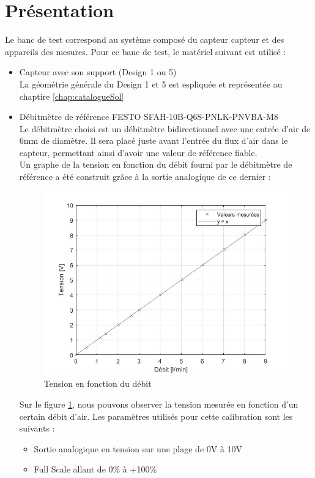 
\section{Présentation}
Le banc de test correspond au système composé du capteur \gls{capteur} et des appareils des mesures. Pour ce banc de test, le matériel suivant est utilisé :
\begin{itemize}
    \item Capteur avec son support (Design 1 ou 5)\\
          La géométrie générale du Design 1 et 5 est espliquée et représentée au chaptire \ref*{chap:catalogueSol}
    \item Débitmètre de référence FESTO SFAH-10B-Q6S-PNLK-PNVBA-M8\\
          Le débitmètre choisi est un débitmètre bidirectionnel avec une entrée d'air de 6mm de diamètre. Il sera placé juste avant l'entrée du flux
          d'air dans le capteur, permettant ainsi d'avoir une valeur de référence fiable.\\

          Un graphe de la tension en fonction du débit fourni par le débitmètre de référence a été construit grâce à la sortie analogique de ce dernier :
          \begin{figure}[H]
              \centering
              \includegraphics[scale = 0.4]{assets/figures/Calibration_maison.jpg}
              \caption{Tension en fonction du débit}
              \label{fig:calibration}
          \end{figure}

          Sur le figure \ref{fig:calibration}, nous pouvons observer la tension mesurée en fonction d'un certain débit d'air. Les paramètres utilisés
          pour cette calibration sont les suivants :
          \begin{itemize}
              \item Sortie analogique en tension sur une plage de 0V à 10V
              \item Full Scale allant de 0\% à +100\%
          \end{itemize}


\end{itemize}
